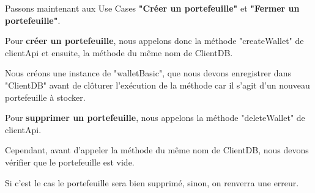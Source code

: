 \begin{flushleft}
Passons maintenant aux Use Cases \textbf{"Créer un portefeuille"} et \textbf{"Fermer un portefeuille"}.
\end{flushleft}

\begin{flushleft}
Pour \textbf{créer un portefeuille}, nous appelons donc la méthode "createWallet" de clientApi et ensuite, la méthode du même nom de ClientDB.
\end{flushleft}

\begin{flushleft}
Nous créons une instance de "walletBasic", que nous devons enregistrer dans "ClientDB" avant de clôturer l'exécution de la méthode car il s'agit d'un nouveau portefeuille à stocker.
\end{flushleft}

\begin{flushleft}
Pour \textbf{supprimer un portefeuille}, nous appelons la méthode "deleteWallet" de clientApi.
\end{flushleft}
\begin{flushleft}
Cependant, avant d'appeler la méthode du même nom de ClientDB, nous devons vérifier que le portefeuille est vide.
\end{flushleft}
\begin{flushleft}
Si c'est le cas le portefeuille sera bien supprimé, sinon, on renverra une erreur.
\end{flushleft}


